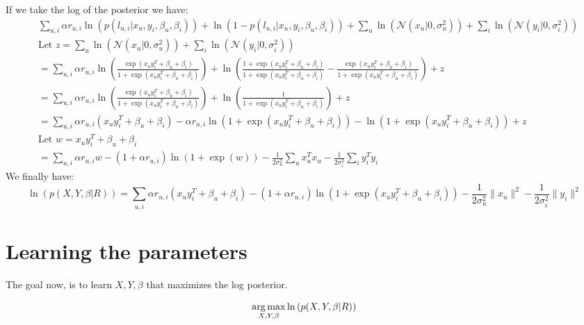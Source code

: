  If we take the log of the posterior we have:
 \begin{align*}
    &\sum_{u,i} \alpha r_{u,i} \ln \left( p(l_{u,i} | x_u, y_i, \beta_u, \beta_i) \right) + \ln \left( 1 - p(l_{u,i} | x_u, y_i, \beta_u, \beta_i) \right) + \sum_u \ln \left( \mathcal{N}(x_u | 0, \sigma_{u}^2) \right) + \sum_i \ln \left( \mathcal{N}(y_i | 0, \sigma_{i}^2) \right) \\
    &\text {Let $z = \sum_{u} \ln \left( \mathcal{N}(x_u | 0, \sigma_{u}^2) \right) + \sum_i \ln \left( \mathcal{N}(y_i | 0, \sigma_{i}^2) \right)$} \\
    &= \sum_{u,i} \alpha r_{u,i} \ln \left( \frac{\exp(x_u y_i^T + \beta_u + \beta_i)}{1 + \exp(x_u y_i^T + \beta_u + \beta_i)} \right) + \ln \left( \frac{1 + \exp(x_u y_i^T + \beta_u + \beta_i)}{1 + \exp(x_u y_i^T + \beta_u + \beta_i)} - \frac{\exp(x_u y_i^T + \beta_u + \beta_i)}{1 + \exp(x_u y_i^T + \beta_u + \beta_i)} \right) + z \\
    &=\sum_{u,i} \alpha r_{u,i} \ln \left( \frac{\exp(x_u y_i^T + \beta_u + \beta_i)}{1 + \exp(x_u y_i^T + \beta_u + \beta_i)} \right) + \ln \left( \frac{1 }{1 + \exp(x_u y_i^T + \beta_u + \beta_i)} \right) + z \\
    &=\sum_{u,i} \alpha r_{u,i}(x_u y_i^T + \beta_u + \beta_i) - \alpha r_{u,i} \ln \left( 1 + \exp(x_u y_i^T + \beta_u + \beta_i) \right) - \ln \left( 1 + \exp(x_u y_i^T + \beta_u + \beta_i) \right) + z \\
    &\text{Let $w = x_u y_i^T + \beta_u + \beta_i$} \\
    &= \sum_{u,i} \alpha r_{u,i}w - (1 + \alpha r_{u,i}) \ln \left( 1 + \exp(w) \right) - \frac{1}{2 \sigma_{u}^2} \sum_u x_u^T x_u - \frac{1}{2 \sigma_{i}^2} \sum_i y_i^T y_i
  \end{align*}
We finally have:
\[
\ln \left( p(X, Y, \beta | R) \right) = \sum_{u,i} \alpha r_{u,i}(x_u y_i^T + \beta_u + \beta_i) - (1 + \alpha r_{u,i}) \ln \left( 1 + \exp(x_u y_i^T + \beta_u + \beta_i) \right) - \frac{1}{2 \sigma_{u}^2} \|x_u\|^2 - \frac{1}{2 \sigma_{i}^2}  \|y_i\|^2
\]

\section{Learning the parameters}

The goal now, is to learn $X, Y, \beta$ that maximizes the log posterior.

\[
\operatorname*{arg\,max}_{X, Y, \beta} \ln \left( p(X, Y, \beta | R) \right)
\]


